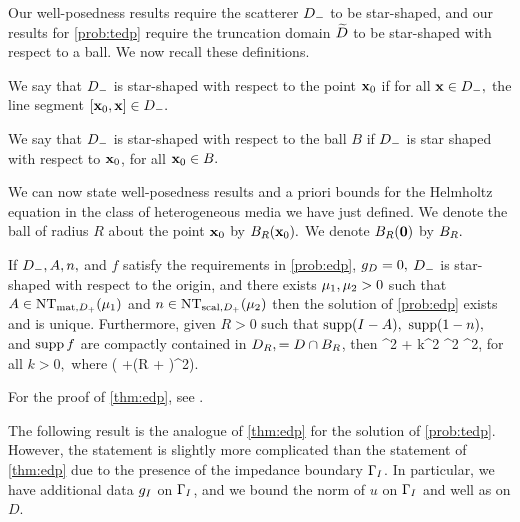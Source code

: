 Our well-posedness results  require the scatterer $D_{-}$ to be star-shaped, and our results for \cref{prob:tedp}  require the truncation domain $\widetilde{D}$ to be star-shaped with respect to a ball. We now recall these definitions.

  We say that $D_{-}$ is star-shaped with respect to the point $\mathbf{x}_{0}$ if for all $\mathbf{x} \in D_{-},$ the line segment $\mleft[\bxz,\bx\mright] \in \Dm.$

  We say that $D_{-}$ is star-shaped with respect to the ball $B$ if $D_{-}$ is star shaped with respect to $\mathbf{x}_{0}$, for all $\mathbf{x}_{0} \in B.$
  \ede

We can now state well-posedness results and a priori bounds for the Helmholtz equation in the class of heterogeneous media we have just defined.  We denote the ball of radius $R$ about the point $\mathbf{x}_{0}$ by $\Ball{R}{\bxz}.$ We denote $\Ball{R}{\bfzero}$ by $B_{R}.$



\label{thm:edp}
If $D_{-}, A, n,$ and $f$ satisfy the requirements in \cref{prob:edp}, $g_{D} = 0,$ $D_{-}$ is star-shaped with respect to the origin, and there exists $\mu_{1}, \mu_{2} > 0$ such that $A \in \NTADp{\muo}$ and $n \in \NTnDp{\mut}$ then the solution of \cref{prob:edp} exists and is unique. Furthermore, given $R>0$ such that $\supp\mleft(I-A\mright),$ $\operatorname{supp}(1-n),$ and $\operatorname{supp} f$ are compactly contained in $D_{R}, = D \cap B_{R}$, then
\beqs
\muo {}^2 + \mut k^2 ^2 \leq \Co {}^2,
\eeqs
for all $k>0,$ where
\beqs
\Co {}\mleft( +\mleft(R + \mright)^2\mright).
\eeqs
\enth

For the proof of \cref{thm:edp}, see \cite[Theorem 2.5]{GrPeSp:19}.

The following result is the analogue of \cref{thm:edp} for the solution of \cref{prob:tedp}. However, the statement is slightly more complicated than the statement of \cref{thm:edp} due to the presence of the impedance boundary $\Gamma_{I}$. In particular, we have additional data $g_{I}$ on $\Gamma_{I}$, and we bound the norm of $u$ on $\Gamma_{I}$ and well as on $D$.

